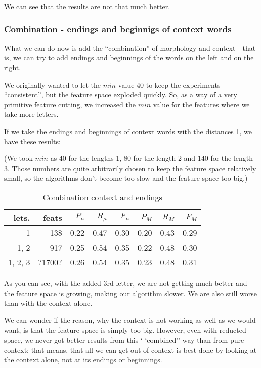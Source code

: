 \documentclass[letterpaper]{article}
\begin{document}
We can see that the results are not that much better.

\subsubsection{Combination - endings and beginnigs of context words}
What we can do now is add the ``combination'' of morphology and context - that is, 
we can try to add endings and beginnings of the words on the left and on the right.

We originally wanted to let the $min$ value 40 to keep the experiments ``consistent'',
but the feature space exploded quickly. So, as a way of a very primitive feature cutting,
we increased the $min$ value for the features where we take more letters.

If we take the endings and beginnings of context words with the distances 1, we have these results:

(We took $min$ as 40 for the lengths 1, 80 for the length 2 and 140 for the length 3. 
Those numbers are quite arbitrarily chosen to keep the feature space relatively small, 
so the algorithms don't become too slow and the feature space too big.)

\begin{table}


\begin{tabular}{|r|r|r|r|r|r|r|r|}
\hline
lets.&feats & $P_\mu$ & $R_\mu$ & $F_\mu$ & $P_M$ & $R_M$  & $F_M$ \\ \hline
1 & 138 & 0.22 & 0.47 & 0.30 & 0.20 & 0.43 & 0.29 \\ \hline
1, 2  & 917 & 0.25 & 0.54 & 0.35 & 0.22 & 0.48 & 0.30 \\ \hline
1, 2, 3  & ?1700? & 0.26 & 0.54 & 0.35 & 0.23 & 0.48 & 0.31 \\ \hline

\end{tabular}
\caption{Combination context and endings}
\end{table}
As you can see, with the added 3rd letter, we are not getting much better and 
the feature space is growing, making our algorithm slower. We are also still worse than with the context alone.


We can wonder if the reason, why the context is not working as 
well as we would want, is that the feature space is simply too big. 
However, even with reducted space, we never got better results from this `
`combined'' way than from pure context; that means, that all we can get out of context 
is best done by looking at the context alone, not at its endings or beginnings.
\end{document}
